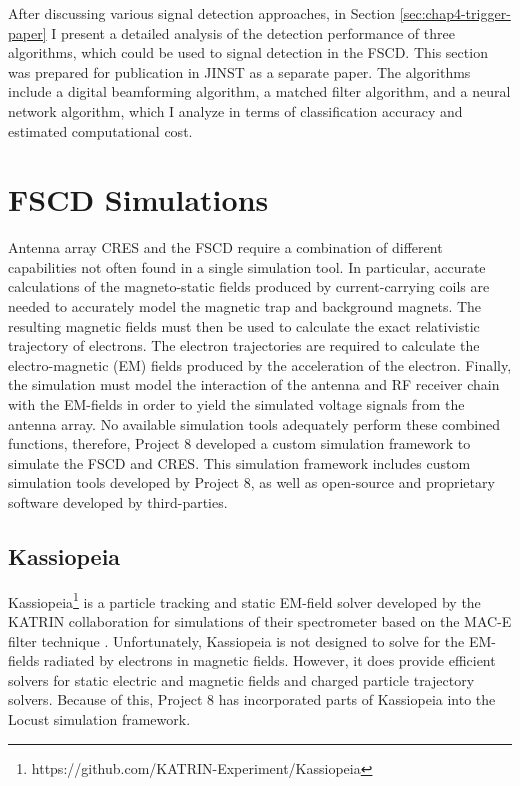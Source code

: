 After discussing various signal detection approaches, in Section \ref{sec:chap4-trigger-paper} I present a detailed analysis of the detection performance of three algorithms, which could be used to signal detection in the FSCD. This section was prepared for publication in JINST as a separate paper. The algorithms include a digital beamforming algorithm, a matched filter algorithm, and a neural network algorithm, which I analyze in terms of classification accuracy and estimated computational cost.  

\section{FSCD Simulations}
\label{sec:chap4-simulations}

Antenna array CRES and the FSCD require a combination of different capabilities not often found in a single simulation tool. In particular, accurate calculations of the magneto-static fields produced by current-carrying coils are needed to accurately model the magnetic trap and background magnets. The resulting magnetic fields must then be used to calculate the exact relativistic trajectory of electrons. The electron trajectories are required to calculate the electro-magnetic (EM) fields produced by the acceleration of the electron. Finally, the simulation must model the interaction of the antenna and RF receiver chain with the EM-fields in order to yield the simulated voltage signals from the antenna array. No available simulation tools adequately perform these combined functions, therefore, Project 8 developed a custom simulation framework to simulate the FSCD and CRES. This simulation framework includes custom simulation tools developed by Project 8, as well as open-source and proprietary software developed by third-parties.

\subsection{Kassiopeia}

Kassiopeia\footnote{https://github.com/KATRIN-Experiment/Kassiopeia} is a particle tracking and static EM-field solver developed by the KATRIN collaboration for simulations of their spectrometer based on the MAC-E filter technique \cite{kassiopeia}. Unfortunately, Kassiopeia is not designed to solve for the EM-fields radiated by electrons in magnetic fields. However, it does provide efficient solvers for static electric and magnetic fields and charged particle trajectory solvers. Because of this, Project 8 has incorporated parts of Kassiopeia into the Locust simulation framework. 

